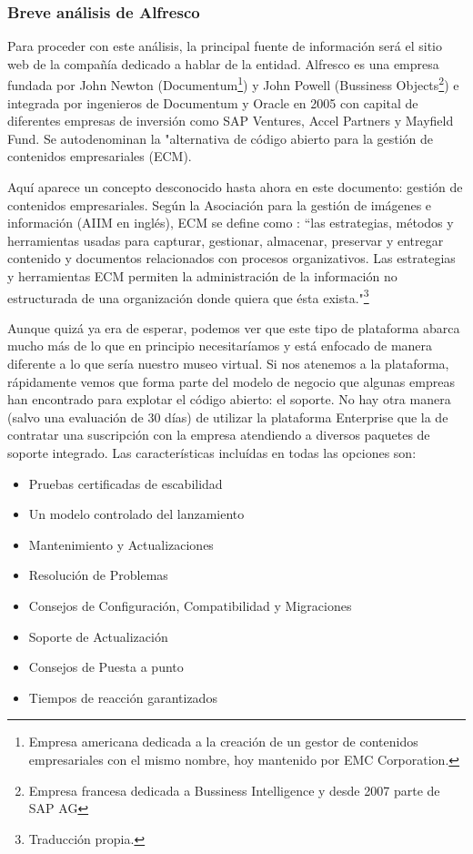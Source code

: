\subsubsection{Breve análisis de Alfresco}
\par Para proceder con este análisis, la principal fuente de información será el sitio web de la compañía dedicado a hablar de la entidad. Alfresco es una empresa fundada por John Newton (Documentum\footnote{Empresa americana dedicada a la creación de un gestor de contenidos empresariales con el mismo nombre, hoy mantenido por EMC Corporation.\cite{references:documentum}}) y John Powell (Bussiness Objects\footnote{Empresa francesa dedicada a Bussiness Intelligence y desde 2007 parte de SAP AG\cite{references:bussinessobjects}}) e integrada por ingenieros de Documentum y Oracle en 2005 con capital de diferentes empresas de inversión como SAP Ventures, Accel Partners y Mayfield Fund. Se autodenominan la "alternativa de código abierto para la gestión de contenidos empresariales (ECM)\cite{references:alfrescoabout}.
\par Aquí aparece un concepto desconocido hasta ahora en este documento: gestión de contenidos empresariales. Según la Asociación para la gestión de imágenes e información (AIIM en inglés), ECM se define como \cite{references:ecmaiim}: ``las estrategias, métodos y herramientas usadas para capturar, gestionar, almacenar, preservar y entregar contenido y documentos relacionados con procesos organizativos. Las estrategias y herramientas ECM permiten la administración de la información no estructurada de una organización donde quiera que ésta exista."\renewcommand{\thefootnote}{\fnsymbol{footnote}}\footnote[1]{Traducción propia.}\renewcommand{\thefootnote}{\arabic{footnote}}	

\par Aunque quizá ya era de esperar, podemos ver que este tipo de plataforma abarca mucho más de lo que en principio necesitaríamos y está enfocado de manera diferente a lo que sería nuestro museo virtual. Si nos atenemos a la plataforma, rápidamente vemos que forma parte del modelo de negocio que algunas empreas han encontrado para explotar el código abierto: el soporte. No hay otra manera (salvo una evaluación de 30 días) de utilizar la plataforma Enterprise que la de contratar una suscripción con la empresa atendiendo a diversos paquetes de soporte integrado. Las características incluídas en todas las opciones son:

\begin{itemize}
\item Pruebas certificadas de escabilidad
\item Un modelo controlado del lanzamiento
\item Mantenimiento y Actualizaciones
\item Resolución de Problemas
\item Consejos de Configuración, Compatibilidad y Migraciones
\item Soporte de Actualización
\item Consejos de Puesta a punto
\item Tiempos de reacción garantizados
\end{itemize}

